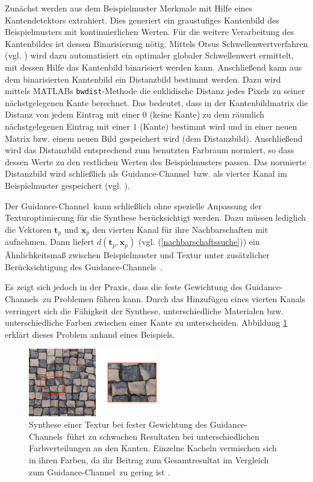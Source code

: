 Zunächst werden aus dem Beispielmuster Merkmale mit Hilfe eines Kantendetektors extrahiert.
Dies generiert ein graustufiges Kantenbild des Beispielmusters mit kontinuierlichen Werten.
Für die weitere Verarbeitung des Kantenbildes ist dessen Binarisierung nötig.
Mittels Otsus Schwellenwertverfahren (vgl. \cite{Otsu}) wird dazu automatisiert ein optimaler globaler Schwellenwert ermittelt, mit dessen Hilfe das Kantenbild binarisiert werden kann.
Anschließend kann aus dem binarisierten Kantenbild ein Distanzbild bestimmt werden.
Dazu wird mittels MATLABs \texttt{bwdist}-Methode die euklidische Distanz jedes Pixels zu seiner nächstgelegenen Kante berechnet.
Das bedeutet, dass in der Kantenbildmatrix die Distanz von jedem Eintrag mit einer $0$ (keine Kante) zu dem räumlich nächstgelegenen Eintrag mit einer $1$ (Kante) bestimmt wird und in einer neuen Matrix bzw. einem neuen Bild gespeichert wird (dem Distanzbild).
Anschließend wird das Distanzbild entsprechend zum benutzten Farbraum normiert, so dass dessen Werte zu den restlichen Werten des Beispielmusters passen.
Das normierte Distanzbild wird schließlich als \glqq Guidance-Channel\grqq \ bzw. als vierter Kanal im Beispielmuster gespeichert (vgl. \cite{SelfTuning}).

Der \glqq Guidance-Channel\grqq \ kann schließlich ohne spezielle Anpassung der Texturoptimierung  für die Synthese berücksichtigt werden.
Dazu müssen lediglich die Vektoren $\textbf{t}_p$ und $\textbf{x}_p$ den vierten Kanal für ihre Nachbarschaften mit aufnehmen.
Dann liefert $d(\textbf{t}_p, \textbf{x}_p)$ (vgl. (\ref{nachbarschaftssuche})) ein Ähnlichkeitsmaß zwischen Beispielmuster und Textur unter zusätzlicher Be\-rück\-sich\-ti\-gung des \glqq Guidance-Channels\grqq \ \cite{SelfTuning}.

Es zeigt sich jedoch in der Praxis, dass die feste Gewichtung des \glqq Guidance-Channels\grqq \ zu Problemen führen kann.
Durch das Hinzufügen eines vierten Kanals verringert sich die Fähigkeit der Synthese, unterschiedliche Materialen bzw. unterschiedliche Farben zwischen einer Kante zu unterscheiden.
Abbildung \ref{guidance-channel-weight} erklärt dieses Problem anhand eines Beispiels.

\begin{figure}
	\centering
	\includegraphics[width=0.5\textwidth]{images/guidance-channel-weight}
	\caption{
		Synthese einer Textur bei fester Gewichtung des \glqq Guidance-Channels\grqq \ führt zu schwachen Resultaten bei unterschiedlichen Farbverteilungen an den Kanten.
		Einzelne Kacheln vermischen sich in ihren Farben, da ihr Beitrag zum Gesamtresultat im Vergleich zum \glqq Guidance-Channel\grqq \ zu gering ist \cite{SelfTuning}.
	}
	\label{guidance-channel-weight}
\end{figure}

